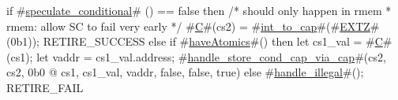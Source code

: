 if #\hyperref[sailRISCVzspeculatezyconditional]{speculate\_conditional}# () == false then {
  /* should only happen in rmem
   * rmem: allow SC to fail very early
   */
  #\hyperref[sailRISCVzC]{C}#(cs2) = #\hyperref[sailRISCVzintzytozycap]{int\_to\_cap}#(#\hyperref[sailRISCVzEXTZ]{EXTZ}#(0b1));
  RETIRE_SUCCESS
} else if #\hyperref[sailRISCVzhaveAtomics]{haveAtomics}#() then {
  let cs1_val = #\hyperref[sailRISCVzC]{C}#(cs1);
  let vaddr = cs1_val.address;
  #\hyperref[sailRISCVzhandlezystorezycondzycapzyviazycap]{handle\_store\_cond\_cap\_via\_cap}#(cs2, cs2, 0b0 @ cs1, cs1_val, vaddr, false, false, true)
} else {
  #\hyperref[sailRISCVzhandlezyillegal]{handle\_illegal}#();
  RETIRE_FAIL
}
